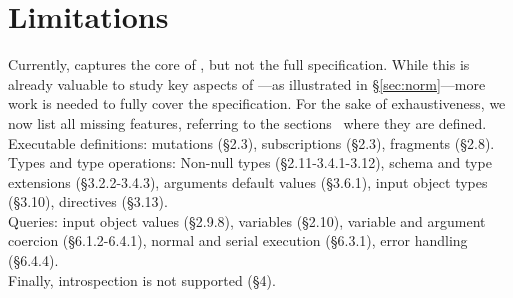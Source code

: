 \section{Limitations}\label{sec:limitations}

Currently, \gcoql captures the core of \gql, but not the full specification. While this is already valuable to study key aspects of \gql---as illustrated in \S\ref{sec:norm}---more work is needed to fully cover the specification. 
For the sake of exhaustiveness, we now list all missing features, referring to the \spec sections~\cite{gqlspec} where they are defined.\\
Executable definitions: mutations (\S2.3), subscriptions (\S2.3), fragments (\S2.8).\\
Types and type operations: Non-null types (\S2.11-3.4.1-3.12), schema and type extensions (\S3.2.2-3.4.3), arguments default values (\S3.6.1), input object types (\S3.10), directives (\S3.13).\\
Queries: input object values (\S2.9.8), variables (\S2.10), variable and argument coercion (\S6.1.2-6.4.1), normal and serial execution (\S6.3.1), error handling (\S6.4.4).\\
Finally, introspection is not supported (\S4). 





